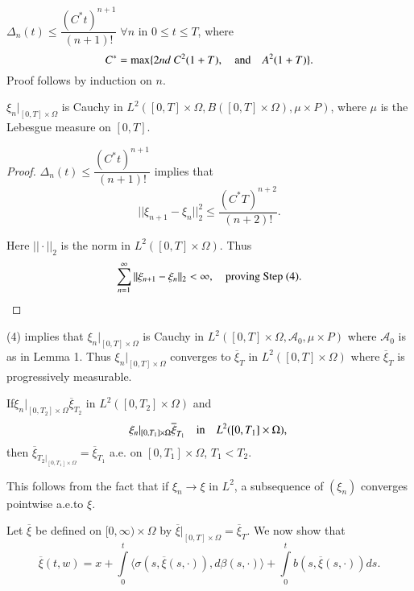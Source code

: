 \begin{step}%
$\Delta_{n}(t)\leq \dfrac{(C^{*}t)^{n+1}}{(n+1)!}\;\forall n$ in $0\leq
  t\leq T$, where
$$
C^{*}=\max\{2nd\ C^{2}(1+T),\quad\text{and}\quad A^{2}(1+T)\}.
$$
Proof follows by induction on $n$.
\end{step}

\begin{step}%
$\xi_{n}|_{[0,T]\times \Omega}$ is Cauchy in $L^{2}([0,T]\times\Omega,
  B([0,T]\times\Omega),\mu\times P)$, where $\mu$ is the Lebesgue
  measure on $[0,T]$. 
\end{step}

\begin{proof}
$\Delta_{n}(t)\leq \dfrac{(C^{*}t)^{n+1}}{(n+1)!}$ implies that
$$
||\xi_{n+1}-\xi_{n}||^{2}_{2}\leq \dfrac{(C^{*}T)^{n+2}}{(n+2)!}.
$$

Here $||\cdot||_{2}$ is the norm in $L^{2}([0,T]\times \Omega)$. Thus
$$
\sum\limits^{\infty}_{n=1}||\xi_{n+1}-\xi_{n}||_{2}<\infty,\quad\text{proving
  Step (4).}
$$
\end{proof}

\begin{step}%
(4) implies that $\xi_{n}|_{[0,T]\times\Omega}$ is Cauchy in
  $L^{2}([0,T]\times\Omega,\mathscr{A}_{0},\mu\times P)$ where
  $\mathscr{A}_{0}$ is as in Lemma 1. Thus
  $\xi_{n}|_{[0,T]\times\Omega}$ converges to $\overline{\xi}_{T}$ in
  $L^{2}([0,T]\times\Omega)$ where $\overline{\xi}_{T}$ is
  progressively measurable.
\end{step}

\begin{step}%
If\pageoriginale $\xi_{n}|_{[0,T_{2}]\times\Omega}\overline{\xi}_{T_{2}}$ in
$L^{2}([0,T_{2}]\times \Omega)$ and
$$
\xi_{n}|_{[0,T_{1}]\times\Omega}\overline{\xi}_{T_{1}}\quad\text{in}\quad
L^{2}([0,T_{1}]\times\Omega),\\ 
$$
then
$\overline{\xi}_{T_{2}|_{[0,T_{1}]\times\Omega}}=\overline{\xi}_{T_{1}}$
a.e. on $[0,T_{1}]\times\Omega$, $T_{1}<T_{2}$.

This follows from the fact that if $\xi_{n}\to \xi$ in $L^{2}$, a
subsequence of $(\xi_{n})$ converges pointwise a.e.\@ to $\xi$.
\end{step}

\begin{step}%
Let $\overline{\xi}$ be defined on $[0,\infty)\times \Omega$ by
  $\overline{\xi}|_{[0,T]\times\Omega}=\overline{\xi}_{T}$. We now
  show that
$$
\overline{\xi}(t,w)=x+\int\limits^{t}_{0}\langle
\sigma(s,\overline{\xi}(s,\cdot)),d\beta(s,\cdot)\rangle
+\int\limits^{t}_{0}b(s,\overline{\xi}(s,\cdot))ds. 
$$
\end{step}

